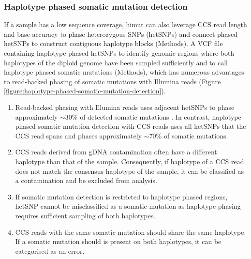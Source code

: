 \pagebreak

\subsubsection{Haplotype phased somatic mutation detection}

If a sample has a low sequence coverage, himut can also leverage CCS read length and base accuracy to phase heterozygous SNPs (hetSNPs) and connect phased hetSNPs to construct contiguous haplotype blocks (Methods). A VCF file containing haplotype phased hetSNPs to identify genomic regions where both haplotypes of the diploid genome have been sampled sufficiently and to call haplotype phased somatic mutations (Methods), which has numerous advantages to read-backed phasing of somatic mutations with Illumina reads (Figure \ref{figure:haplotype-phased-somatic-mutation-detection}).

\begin{enumerate}
\item Read-backed phasing with Illumina reads uses adjacent hetSNPs to phase approximately $\sim$30\% of detected somatic mutations \cite{Nik-Zainal2012-nz}. In contrast, haplotype phased somatic mutation detection with CCS reads uses all hetSNPs that the CCS read spans and phases approximately $\sim$70\% of somatic mutations.
\item CCS reads derived from gDNA contamination often have a different haplotype than that of the sample. Consequently, if haplotype of a CCS read does not match the consensus haplotype of the sample, it can be classified as a contamination and be excluded from analysis.
\item If somatic mutation detection is restricted to haplotype phased regions, hetSNP cannot be misclassified as a somatic mutation as haplotype phasing requires sufficient sampling of both haplotypes.
\item CCS reads with the same somatic mutation should share the same haplotype. If a somatic mutation should is present on both haplotypes, it can be categorised as an error.
\end{enumerate}

